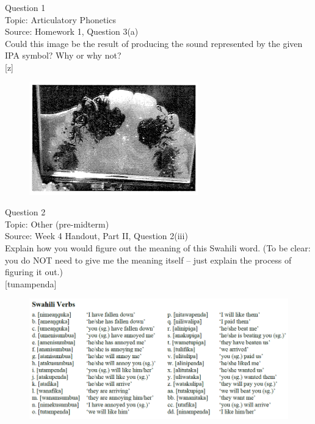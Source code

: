 \documentclass[12pt]{article}
\begin{document}
\begin{center}
\textbf{{\color{blue}{\HUGE START OF EXAM\\}}}

\textbf{{\color{blue}{\HUGE Student ID: 89289\\}}}

\textbf{{\color{blue}{\HUGE 4:40\\}}}

\end{center}
\newpage

{\large Question 1}\\

Topic: Articulatory Phonetics\\
Source: Homework 1, Question 3(a)\\

Could this image be the result of producing the sound represented by the given IPA symbol? Why or why not?\\

{[z]}

\begin{figure}[H]
\includegraphics{../images/staticpalatography_fricative.png}
\end{figure}

\newpage

{\large Question 2}\\

Topic: Other (pre-midterm)\\
Source: Week 4 Handout, Part II, Question 2(iii)\\

Explain how you would figure out the meaning of this Swahili word. (To be clear: you do NOT need to give me the meaning itself -- just explain the process of figuring it out.)\\

{[tunampenda]}

\begin{figure}[H]
\includegraphics{../images/swahiliverbs.png}
\end{figure}
\end{document}
